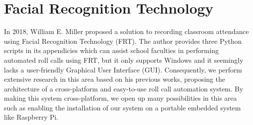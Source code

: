 \section{Facial Recognition Technology}
In 2018, William E. Miller proposed a solution to recording classroom attendance using
Facial Recognition Technology (FRT). The author provides three Python scripts in its
appendicies which can assist school faculties in performing automated roll calls using FRT,
but it only supports Windows and it seemingly lacks a user-friendly Graphical User Interface (GUI). 
Consequently, we perform extensive research in this area based on his previous works,
proposing the architecture of a cross-platform and easy-to-use roll call automation system.
By making this system cross-platform, we open up many possibilities in this area such as
enabling the installation of our system on a portable embedded system like Raspberry Pi.
